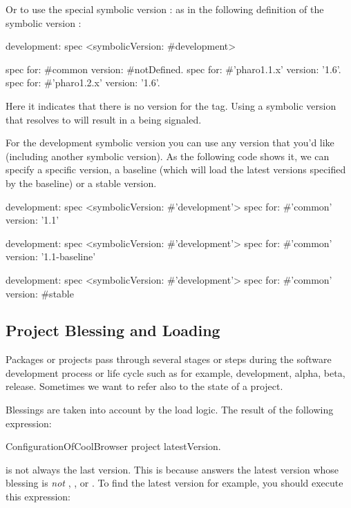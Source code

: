 \documentclass[a4paper,10pt,twoside]{book}
\begin{document}
Or to use the special symbolic version : as in the following definition of the symbolic version :

\begin{code}{}
development: spec
       <symbolicVersion: #development>

       spec for: #common version: #notDefined.
       spec for: #'pharo1.1.x' version: '1.6'.
       spec for: #'pharo1.2.x' version: '1.6'.
\end{code}

Here it indicates that there is no version for the  tag.
Using a symbolic version that resolves to  will result in a  being signaled.



For the development symbolic version you can use any version that you'd like (including another symbolic version). As the following code shows it, we can specify a specific version, a baseline (which will load the latest versions specified by the baseline) or a stable version.

\begin{code}{}
development: spec
       <symbolicVersion: #'development'>
       spec for: #'common' version: '1.1'

development: spec
       <symbolicVersion: #'development'>
       spec for: #'common' version: '1.1-baseline'

development: spec
       <symbolicVersion: #'development'>
       spec for: #'common' version: #stable
\end{code}



\subsection{Project Blessing and Loading}
Packages or projects pass through several stages or steps during the software development process or life cycle such as for example, development, alpha, beta, release. Sometimes we want to refer also to the state of a project.

Blessings are taken into account by the load logic. The result of the following expression:
\begin{code}{}
ConfigurationOfCoolBrowser project latestVersion.
\end{code}
is not always the last version.  This is because  answers the latest version whose blessing is {\em not} , , or . To find the latest  version for example, you should execute this expression:
\end{document}
